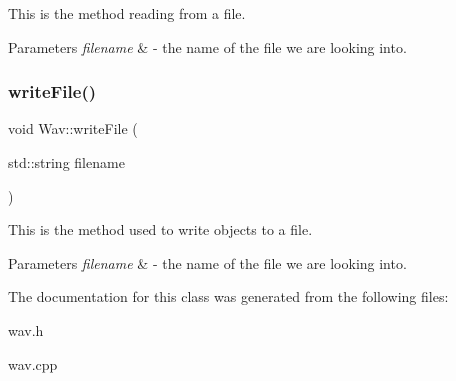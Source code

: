 This is the method reading from a file. 
\begin{DoxyParams}{Parameters}
{\em filename} & -\/ the name of the file we are looking into. \\
\hline
\end{DoxyParams}
\mbox{\label{classWav_a6d6641b1934a56113c9611e00b27fba8}} 
\subsubsection{\texorpdfstring{write\+File()}{writeFile()}}
{\footnotesize\ttfamily void Wav\+::write\+File (\begin{DoxyParamCaption}\item[{std\+::string}]{filename }\end{DoxyParamCaption})}

This is the method used to write objects to a file. 
\begin{DoxyParams}{Parameters}
{\em filename} & -\/ the name of the file we are looking into. \\
\hline
\end{DoxyParams}


The documentation for this class was generated from the following files\+:\begin{DoxyCompactItemize}
\item 
wav.\+h\item 
wav.\+cpp\end{DoxyCompactItemize}
